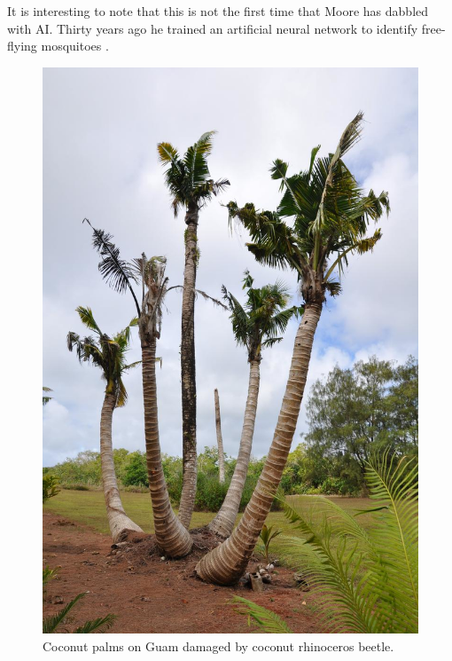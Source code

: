 \documentclass[letterpaper, 11pt]{scrartcl}
\begin{document}
It is interesting to note that this is not the first time that Moore has dabbled with AI. Thirty years ago he trained an artificial neural network to identify free-flying mosquitoes \cite{moore1991}.


\begin{figure}
	\centering
	\includegraphics[width=0.8\linewidth]{images/dying_coconuts.png}
	\caption{Coconut palms on Guam damaged by coconut rhinoceros beetle.}
	\label{fig:dying_coconuts}
\end{figure}
\end{document}
